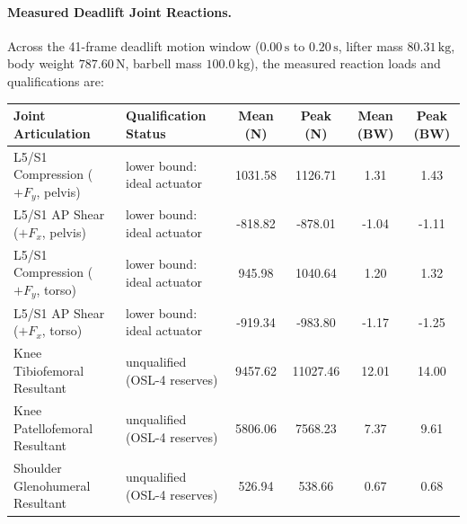 \documentclass[11pt,a4paper]{article}
\begin{document}
\paragraph{Measured Deadlift Joint Reactions.}
Across the 41-frame deadlift motion window ($0.00\,\mathrm{s}$ to $0.20\,\mathrm{s}$, lifter mass $80.31\,\mathrm{kg}$, body weight $787.60\,\mathrm{N}$, barbell mass $100.0\,\mathrm{kg}$),
the measured reaction loads and qualifications are:
\begin{center}\footnotesize\setlength{\tabcolsep}{3pt}
\begin{tabular}{llcccc}
\toprule
Joint Articulation & Qualification Status & Mean (N) & Peak (N) & Mean (BW) & Peak (BW)\\
\midrule
L5/S1 Compression ($+F_y$, pelvis) & lower bound: ideal actuator & 1031.58 & 1126.71 & 1.31 & 1.43\\
L5/S1 AP Shear ($+F_x$, pelvis) & lower bound: ideal actuator & -818.82 & -878.01 & -1.04 & -1.11\\
L5/S1 Compression ($+F_y$, torso) & lower bound: ideal actuator & 945.98 & 1040.64 & 1.20 & 1.32\\
L5/S1 AP Shear ($+F_x$, torso) & lower bound: ideal actuator & -919.34 & -983.80 & -1.17 & -1.25\\
Knee Tibiofemoral Resultant & unqualified (OSL-4 reserves) & 9457.62 & 11027.46 & 12.01 & 14.00\\
Knee Patellofemoral Resultant & unqualified (OSL-4 reserves) & 5806.06 & 7568.23 & 7.37 & 9.61\\
Shoulder Glenohumeral Resultant & unqualified (OSL-4 reserves) & 526.94 & 538.66 & 0.67 & 0.68\\
\bottomrule
\end{tabular}
\end{center}
\end{document}
